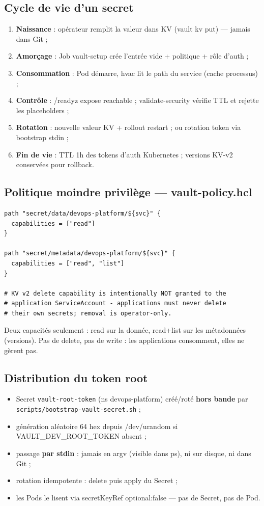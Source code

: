 \documentclass[12pt,a4paper]{article}
\begin{document}
\subsection{Cycle de vie d'un secret}
\begin{enumerate}[itemsep=1pt]
  \item \textbf{Naissance} : opérateur remplit la valeur dans KV (vault kv put) --- jamais dans Git ;
  \item \textbf{Amorçage} : Job vault-setup crée l'entrée vide + politique + rôle d'auth ;
  \item \textbf{Consommation} : Pod démarre, hvac lit le path du service (cache processus) ;
  \item \textbf{Contrôle} : /readyz expose reachable ; validate-security vérifie TTL et rejette les placeholders ;
  \item \textbf{Rotation} : nouvelle valeur KV + rollout restart ; ou rotation token via bootstrap stdin ;
  \item \textbf{Fin de vie} : TTL 1h des tokens d'auth Kubernetes ; versions KV-v2 conservées pour rollback.
\end{enumerate}

\subsection{Politique moindre privilège --- vault-policy.hcl}
\begin{lstlisting}[caption={k8s/vault/vault-policy.hcl --- intégralité utile}]
path "secret/data/devops-platform/${svc}" {
  capabilities = ["read"]
}

path "secret/metadata/devops-platform/${svc}" {
  capabilities = ["read", "list"]
}

# KV v2 delete capability is intentionally NOT granted to the
# application ServiceAccount - applications must never delete
# their own secrets; removal is operator-only.
\end{lstlisting}

Deux capacités seulement : read sur la donnée, read+list sur les métadonnées (versions). Pas de delete, pas de write : les applications consomment, elles ne gèrent pas.

\subsection{Distribution du token root}
\begin{itemize}[itemsep=1pt]
  \item Secret \texttt{vault-root-token} (ns devops-platform) créé/roté \textbf{hors bande} par \texttt{scripts/bootstrap-vault-secret.sh} ;
  \item génération aléatoire 64 hex depuis /dev/urandom si VAULT\_DEV\_ROOT\_TOKEN absent ;
  \item passage \textbf{par stdin} : jamais en argv (visible dans ps), ni sur disque, ni dans Git ;
  \item rotation idempotente : delete puis apply du Secret ;
  \item les Pods le lisent via secretKeyRef optional:false --- pas de Secret, pas de Pod.
\end{itemize}
\end{document}
